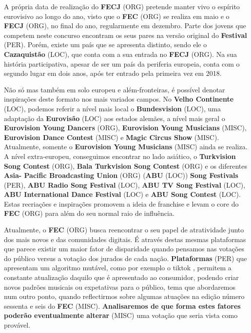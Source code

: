 \documentclass[12pt,a4paper]{article}
\begin{document}
A própria data de realização do \textbf{FECJ} (ORG) pretende manter vivo o espírito eurovisivo ao longo do ano, visto que o \textbf{FEC} (ORG) se realiza em maio e o \textbf{FECJ} (ORG), no final do ano, regularmente em dezembro. Parte  dos jovens que competem  neste concurso encontram  os seus pares na versão original do \textbf{Festival} (PER). Porém, existe um país que se apresenta distinto, sendo ele o \textbf{Cazaquistão} (LOC), que conta com a sua entrada no \textbf{FECJ} (ORG). Na sua história participativa, apesar de ser um país da periferia europeia, conta com o segundo lugar em dois anos, após ter entrado pela primeira vez em 2018.

Não  só  mas  também  em  solo  europeu  e  além-fronteiras,  é  possível  denotar inspirações  deste  formato  nos  mais  variados  campos.  No  \textbf{Velho  Continente} (LOC),  podemos referir  a  nível  mais  local  o  \textbf{Bundesvision} (LOC),  uma  adaptação  da  \textbf{Eurovisão} (LOC)  aos  estados alemães, a nível mais geral o \textbf{Eurovision Young Dancers} (ORG), \textbf{Eurovision Young Musicians} (MISC), \textbf{Eurovision  Dance  Contest} (MISC)  e  \textbf{Magic  Circus  Show} (MISC).  Atualmente,  somente  o  \textbf{Eurovision Young Musicians} (MISC) ainda se realiza. A nível extra-europeu, conseguimos encontrar no lado asiático, o \textbf{Turkvision Song Contest} (ORG), \textbf{Bala Turkvision Song Contest} (ORG) e os diferentes \textbf{Asia- Pacific Broadcasting Union} (ORG) (\textbf{ABU} (LOC)) \textbf{Song Festivals} (PER), \textbf{ABU Radio Song Festival} (LOC), \textbf{ABU TV Song Festival} (LOC), \textbf{ABU International Dance Festival} (LOC) e \textbf{ABU Song Contest} (LOC). Estas recriações e inspirações promovem a ideia de franchise e levam o core do \textbf{FEC} (ORG) para além do seu normal raio de influência.

Atualmente, o \textbf{FEC} (ORG) busca reencontrar o seu papel de atratividade junto dos mais novos e das comunidades digitais. É através destas mesmas plataformas que parece existir um maior fator de disparidade quando pensamos nas votações do público versus a votação dos jurados de cada nação. \textbf{Plataformas} (PER) que apresentam um algoritmo mutável, como por exemplo  o tiktok ,  permitem  a  constante  atualização  daquilo  que  é  apresentado  ao consumidor, podendo criar novos padrões musicais ou expetativas para o público, tema que abordaremos num outro ponto, quando reflectirmos sobre algumas atuações na edição número  sessenta  e  seis  do  \textbf{FEC} (MISC).  \textbf{Analisaremos  de  que  forma  estes  fatores  poderão eventualmente alterar} (MISC) uma votação que seria vista como provável.
\end{document}
